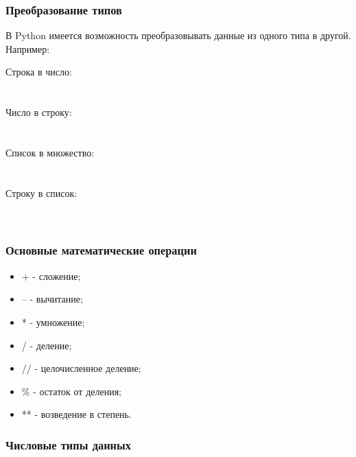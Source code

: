 \subsubsection{Преобразование типов}

В Python имеется возможность преобразовывать данные из одного типа в другой. Например:

\begin{flushleft}
	Строка в число: \\
	 \\ 
	 \\
	\vspace{1cm}
	Число в строку: \\
	 \\
	 \\
	\vspace{1cm}
	Список в множество: \\
	 \\
	 \\
	\vspace{1cm}
	Строку в список: \\
	 \\
	 \\
\end{flushleft}

\subsubsection{Основные математические операции}
\begin{itemize}
	\setlength\itemsep{0.01cm}
	\item[] + - сложение;
	\item[] -- - вычитание;
	\item[] * - умножение;
	\item[] / - деление;
	\item[] // - целочисленное деление;
	\item[] \% - остаток от деления;
	\item[] ** - возведение в степень.
\end{itemize}

\subsubsection{Числовые типы данных}

